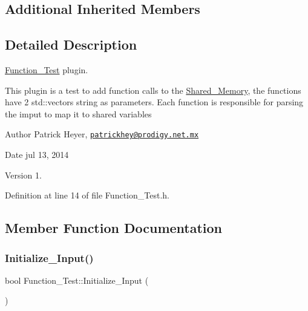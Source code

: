 \subsection*{Additional Inherited Members}


\subsection{Detailed Description}
\hyperlink{class_function___test}{Function\+\_\+\+Test} plugin. 

This plugin is a test to add function calls to the \hyperlink{class_shared___memory}{Shared\+\_\+\+Memory}, the functions have 2 std\+::vectors string as parameters. Each function is responsible for parsing the imput to map it to shared variables \begin{DoxyAuthor}{Author}
Patrick Heyer, \href{mailto:patrickhey@prodigy.net.mx}{\tt patrickhey@prodigy.\+net.\+mx} 
\end{DoxyAuthor}
\begin{DoxyDate}{Date}
jul 13, 2014 
\end{DoxyDate}
\begin{DoxyVersion}{Version}
1. 
\end{DoxyVersion}


Definition at line 14 of file Function\+\_\+\+Test.\+h.



\subsection{Member Function Documentation}
\mbox{\label{class_function___test_a4d937dda611ec1b3bbdd70cdad6d76d2}} 
\subsubsection{\texorpdfstring{Initialize\+\_\+\+Input()}{Initialize\_Input()}}
{\footnotesize\ttfamily bool Function\+\_\+\+Test\+::\+Initialize\+\_\+\+Input (\begin{DoxyParamCaption}{ }\end{DoxyParamCaption})\hspace{0.3cm}{\ttfamily [virtual]}}



